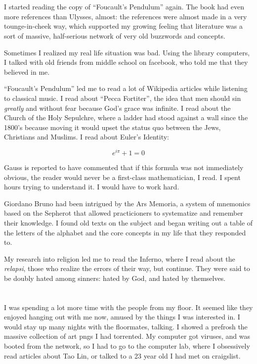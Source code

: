 \section{}

I started reading the copy of ``Foucault's Pendulum'' again.  The book had even
more references than Ulysses, almost: the references were almost made in a very
tounge-in-cheek way, which supported my growing feeling that literature was a
sort of massive, half-serious network of very old buzzwords and concepts.

Sometimes I realized my real life situation was bad.  Using the library
computers, I talked with old friends from middle school on facebook, who told me
that they believed in me.  

``Foucault's Pendulum'' led me to read a lot of Wikipedia articles while
listening to classical music.  I read about ``Pecca Fortiter'', the idea that
men should sin \textit{greatly} and without fear because God's grace was
infinite.  I read about the Church of the Holy Sepulchre, where a ladder had
stood against a wall since the 1800's because moving it would upset the status
quo between the Jews, Christians and Muslims.  I read about Euler's Identity:

\begin{equation}
  e^{i\pi} + 1 = 0
\end{equation}
      
Gauss is reported to have commented that if this formula was not immediately
obvious, the reader would never be a first-class mathematician, I read.  I spent
hours trying to understand it.  I would have to work hard.

Giordano Bruno had been intrigued by the Ars Memoria, a system of mnemonics
based on the Sepherot that allowed practicioners to systematize and remember
their knowledge.  I found old texts on the subject and began writing out a table
of the letters of the alphabet and the core concepts in my life that they
responded to.

My research into religion led me to read the Inferno, where I read about the 
\textit{relapsi}, those who realize the errors of their way, but continue.  They
were said to be doubly hated among sinners: hated by God, and hated by
themselves.


\section{}

I was spending a lot more time with the people from my floor.  It seemed like
they enjoyed hanging out with me now, amused by the things I was interested in.
I would stay up many nights with the floormates, talking.  I showed a prefrosh
the massive collection of art pngs I had torrented.  My computer got viruses,
and was booted from the network, so I had to go to the computer lab, where I
obsessively read articles about Tao Lin, or talked to a 23 year old I had met on
craigslist.  

